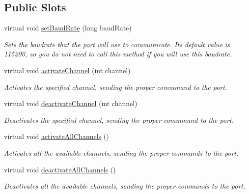 \subsection*{Public Slots}
\begin{DoxyCompactItemize}
\item 
virtual void \hyperlink{classAcquisitionServer_a6fd77361e5704bc75d3b33a64b4be9c1}{set\+Baud\+Rate} (long baud\+Rate)
\begin{DoxyCompactList}\small\item\em Sets the baudrate that the port will use to communicate. Its default value is 115200, so you do not need to call this method if you will use this baudrate. \end{DoxyCompactList}\item 
virtual void \hyperlink{classAcquisitionServer_ad197a4fd5e3c4d9f4edde8e43f27c8e4}{activate\+Channel} (int channel)
\begin{DoxyCompactList}\small\item\em Activates the specified channel, sending the proper commmand to the port. \end{DoxyCompactList}\item 
virtual void \hyperlink{classAcquisitionServer_ac4cc199b5d0610892f7fc6054a235a92}{deactivate\+Channel} (int channel)
\begin{DoxyCompactList}\small\item\em Deactivates the specified channel, sending the proper commmand to the port. \end{DoxyCompactList}\item 
\hypertarget{classAcquisitionServer_a799383970298f957c0498b50dcdd8d4c}{virtual void \hyperlink{classAcquisitionServer_a799383970298f957c0498b50dcdd8d4c}{activate\+All\+Channels} ()}\label{classAcquisitionServer_a799383970298f957c0498b50dcdd8d4c}

\begin{DoxyCompactList}\small\item\em Activates all the available channels, sending the proper commands to the port. \end{DoxyCompactList}\item 
\hypertarget{classAcquisitionServer_aca854d4811b4749eb2472781d5710597}{virtual void \hyperlink{classAcquisitionServer_aca854d4811b4749eb2472781d5710597}{deactivate\+All\+Channels} ()}\label{classAcquisitionServer_aca854d4811b4749eb2472781d5710597}

\begin{DoxyCompactList}\small\item\em Deactivates all the available channels, sending the proper commands to the port. \end{DoxyCompactList}\end{DoxyCompactItemize}
